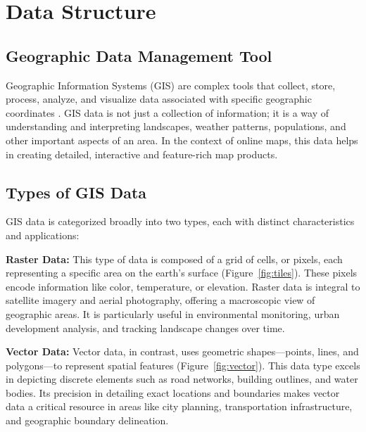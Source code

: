 \documentclass[10pt,oneside,english,a4paper]{article}
\begin{document}
\section{Data Structure} \label{data}

\subsection {Geographic Data Management Tool} \label{data:gis}
Geographic Information Systems (GIS) are complex tools that collect, store, process, analyze, and visualize data associated with specific geographic coordinates \cite{LandId2021}. GIS data is not just a collection of information; it is a way of understanding and interpreting landscapes, weather patterns, populations, and other important aspects of an area. In the context of online maps, this data helps in creating detailed, interactive and feature-rich map products.

\subsection {Types of GIS Data} \label{data:types}
GIS data is categorized broadly into two types, each with distinct characteristics and applications\cite{Chang2016}:

\textbf{Raster Data:} This type of data is composed of a grid of cells, or pixels, each representing a specific area on the earth's surface (Figure~\ref{fig:tiles}). These pixels encode information like color, temperature, or elevation. Raster data is integral to satellite imagery and aerial photography, offering a macroscopic view of geographic areas. It is particularly useful in environmental monitoring, urban development analysis, and tracking landscape changes over time.

\textbf{Vector Data:} Vector data, in contrast, uses geometric shapes—points, lines, and polygons—to represent spatial features (Figure~\ref{fig:vector}). This data type excels in depicting discrete elements such as road networks, building outlines, and water bodies. Its precision in detailing exact locations and boundaries makes vector data a critical resource in areas like city planning, transportation infrastructure, and geographic boundary delineation.
\end{document}
